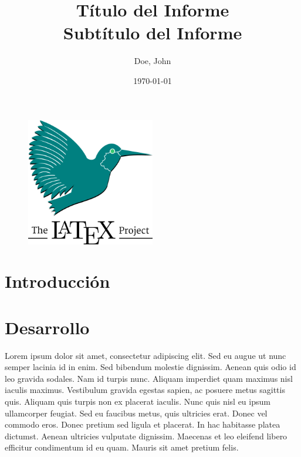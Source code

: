 \documentclass[12pt]{article}
\begin{document}
\title{\textbf{Título del Informe} \\ \large \textbf{Subtítulo del Informe}}
\author{Doe, John}
\date{\today}

\maketitle %

\thispagestyle{empty}

\begin{figure}[htbp]
    \centering
    \includegraphics[width=0.5\textwidth]{../assets/latex.png}
\end{figure}

\newpage
\thispagestyle{empty}
\tableofcontents
\newpage

\setcounter{page}{1} %

\section{Introducción}



\section{Desarrollo}

Lorem ipsum dolor sit amet, consectetur adipiscing elit. 
Sed eu augue ut nunc semper lacinia id in enim. Sed bibendum 
molestie dignissim. Aenean quis odio id leo gravida sodales. 
Nam id turpis nunc. Aliquam imperdiet quam maximus nisl 
iaculis maximus. Vestibulum gravida egestas sapien, ac posuere 
metus sagittis quis. Aliquam quis turpis non ex placerat iaculis. 
Nunc quis nisl eu ipsum ullamcorper feugiat. Sed eu faucibus metus, 
quis ultricies erat. Donec vel commodo eros. Donec pretium sed 
ligula et placerat. In hac habitasse platea dictumst. 
Aenean ultricies vulputate dignissim. Maecenas et leo eleifend 
libero efficitur condimentum id eu quam. Mauris sit amet pretium felis.
\end{document}
